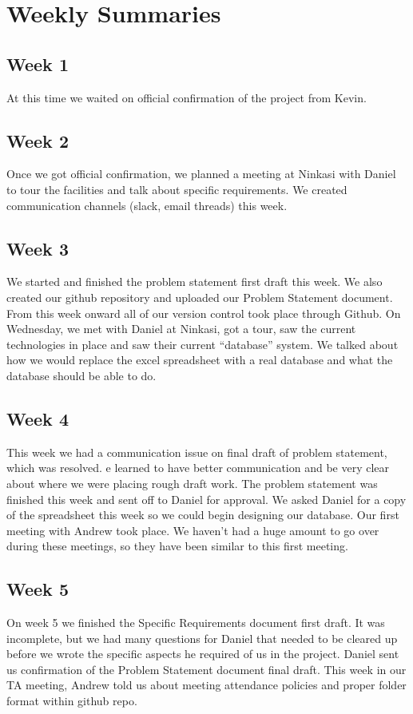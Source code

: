 \documentclass[draftclsnofoot,onecolumn,letterpaper,10pt,compsoc]{IEEEtran}
\begin{document}
\section{Weekly Summaries}
\subsection{Week 1}
At this time we waited on official confirmation of the project from Kevin.
\subsection{Week 2}
Once we got official confirmation, we planned a meeting at Ninkasi with Daniel to tour the facilities and talk about specific requirements.
We created communication channels (slack, email threads) this week.
\subsection{Week 3}
We started and finished the problem statement first draft this week. We also created our github repository and uploaded our Problem Statement document.
From this week onward all of our version control took place through Github. On Wednesday, we met with Daniel at Ninkasi, got a tour, saw the current technologies in place and saw their current “database” system.
We talked about how we would replace the excel spreadsheet with a real database and what the database should be able to do.
\subsection{Week 4}
This week we had a communication issue on final draft of problem statement, which was resolved.
e learned to have better communication and be very clear about where we were placing rough draft work.
The problem statement was finished this week and sent off to Daniel for approval.
We asked Daniel for a copy of the spreadsheet this week so we could begin designing our database.
Our first meeting with Andrew took place. We haven’t had a huge amount to go over during these meetings, so they have been similar to this first meeting.
\subsection{Week 5}
On week 5 we finished the Specific Requirements document first draft.
It was incomplete, but we had many questions for Daniel that needed to be cleared up before we wrote the specific aspects he required of us in the project.
Daniel sent us confirmation of the Problem Statement document final draft.
This week in our TA meeting, Andrew told us about meeting attendance policies and proper folder format within github repo.
\end{document}
